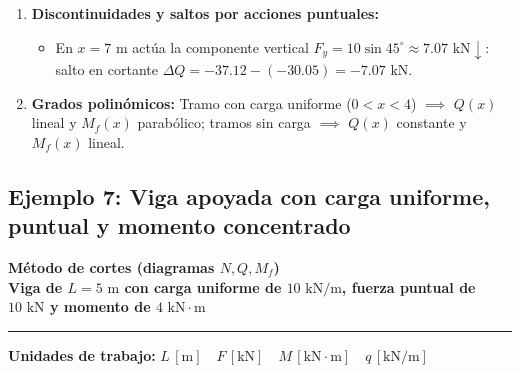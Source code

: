 {\begin{enumerate}
\begin{itemize}
              \end{itemize}

        \item \textbf{Discontinuidades y saltos por acciones puntuales:}

              \begin{itemize}

                  \item En $x = 7\text{ m}$ actúa la componente vertical $F_y = 10\sin 45^\circ \approx 7.07\text{ kN}\downarrow$: salto en cortante $\Delta Q = -37.12 - (-30.05) = -7.07\text{ kN}$.

              \end{itemize}

        \item \textbf{Grados polinómicos:} Tramo con carga uniforme ($0 < x < 4$) $\implies$ $Q(x)$ lineal y $M_f(x)$ parabólico; tramos sin carga $\implies$ $Q(x)$ constante y $M_f(x)$ lineal.

    \end{enumerate}

}





\subsection{Ejemplo 7: Viga apoyada con carga uniforme, puntual y momento concentrado}



\begin{tcolorbox}[colback=blue!3!white, colframe=blue!40!black, arc=3pt, boxrule=0.8pt, left=8pt, right=8pt, top=6pt, bottom=6pt]

    \centering

    {\Large\bfseries\color{blue!60!black} Método de cortes (diagramas $N, Q, M_f$)}\\[2pt]

    {\normalsize\bfseries Viga de $L = 5\text{ m}$ con carga uniforme de $10\text{ kN/m}$, fuerza puntual de $10\text{ kN}$ y momento de $4\text{ kN}\cdot\text{m}$}



    \vspace{4pt}\hrule\vspace{4pt}

    {\small\textbf{Unidades de trabajo:} $L\,[\text{m}] \quad F\,[\text{kN}] \quad M\,[\text{kN}\cdot\text{m}] \quad q\,[\text{kN/m}]$}

\end{tcolorbox}



